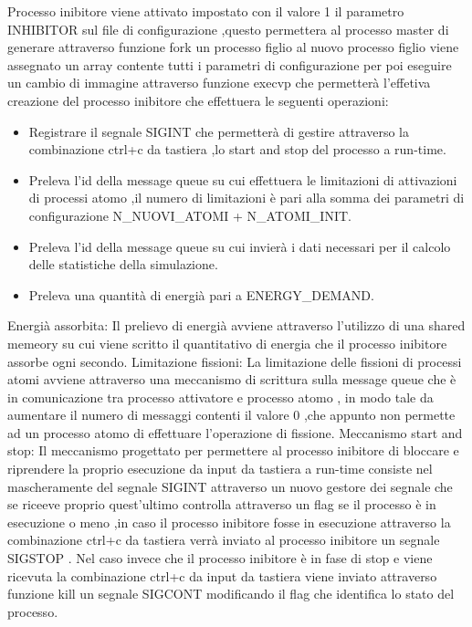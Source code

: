 Processo inibitore viene attivato impostato con il valore 1  il parametro INHIBITOR sul file di configurazione ,questo permettera al processo master di generare attraverso funzione fork un processo figlio al nuovo processo figlio viene assegnato un array contente tutti i parametri di configurazione per poi eseguire un cambio di immagine attraverso funzione execvp che permetterà l'effetiva creazione del processo inibitore che effettuera le seguenti operazioni: 
\begin{itemize}
    \item Registrare il segnale SIGINT che permetterà di gestire attraverso la combinazione ctrl+c da tastiera ,lo start and stop del processo a run-time.
    \item Preleva l'id della message queue su cui effettuera le limitazioni di attivazioni di processi atomo ,il numero di limitazioni è pari alla somma dei parametri di configurazione N\_NUOVI\_ATOMI + N\_ATOMI\_INIT. 
    \item Preleva l'id della message queue su cui invierà i dati necessari per il calcolo delle statistiche della simulazione. 
    \item Preleva una quantità di energià pari a ENERGY\_DEMAND.
\end{itemize}
Energià assorbita: 
Il prelievo di energià avviene attraverso l'utilizzo di una shared memeory su cui viene scritto il quantitativo di energia che il processo inibitore assorbe ogni secondo. 
Limitazione fissioni: 
La limitazione delle fissioni di processi atomi avviene attraverso una meccanismo di scrittura sulla message queue che è in comunicazione tra processo attivatore e processo atomo , in modo tale da aumentare il numero di messaggi contenti il valore 0 ,che appunto non permette ad un processo atomo di effettuare l'operazione di fissione. 
Meccanismo start and stop: 
Il meccanismo progettato per permettere al processo inibitore di bloccare e riprendere la proprio esecuzione da input da tastiera a run-time consiste nel mascheramente del segnale SIGINT attraverso un nuovo gestore dei segnale che se riceeve proprio quest'ultimo controlla attraverso un flag se il processo è in esecuzione o meno ,in caso il processo inibitore fosse in esecuzione attraverso la combinazione ctrl+c da tastiera verrà inviato al processo inibitore un segnale SIGSTOP .
Nel caso invece che il processo inibitore è in fase di stop e viene ricevuta la combinazione ctrl+c da input da tastiera viene inviato attraverso funzione kill un segnale SIGCONT modificando il flag che identifica lo stato del processo. 